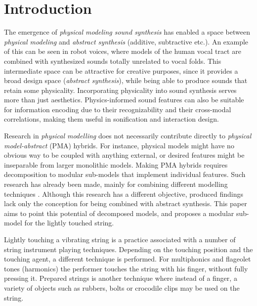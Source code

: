 \documentclass{sigchi}
\def\plainkeywords{physical modelling; audio features}
\begin{document}

\keywords{\plainkeywords}

\printccsdesc

\section{Introduction}

The emergence of \textit{physical modeling sound synthesis} has enabled a space between \textit{physical modeling} and \textit{abstract synthesis} (additive, subtractive etc.). An example of this can be seen in robot voices, where models of the human vocal tract are combined with synthesized sounds totally unrelated to vocal folds. This intermediate space can be attractive for creative purposes, since it provides a broad design space (\textit{abstract synthesis}), while being able to produce sounds that retain some physicality. Incorporating physicality into sound synthesis serves more than just aesthetics. Physics-informed sound features can also be suitable for information encoding due to their recognizability and their cross-modal correlations, making them useful in sonification and interaction design.

Research in \textit{physical modelling} does not necessarily contribute directly to \textit{physical model-abstract} (PMA) hybrids. For instance, physical models might have no obvious way to be coupled with anything external, or desired features might be inseparable from larger monolithic models. Making PMA hybrids requires decomposition to modular sub-models that implement individual features. Such research has already been made, mainly for combining different modelling techniques \cite{erkut_modular_2005,karjalainen_plucked-string_1998}. Although this research has a different objective, produced findings lack only the conception for being combined with abstract synthesis. This paper aims to point this potential of decomposed models, and proposes a modular sub-model for the lightly touched string.

Lightly touching a vibrating string is a practice associated with a number of string instrument playing techniques. Depending on the touching position and the touching agent, a different technique is performed. For multiphonics and flageolet tones (harmonics) the performer touches the string with his finger, without fully pressing it. Prepared strings is another technique where instead of a finger, a variety of objects such as rubbers, bolts or crocodile clips may be used on the string.
\end{document}
